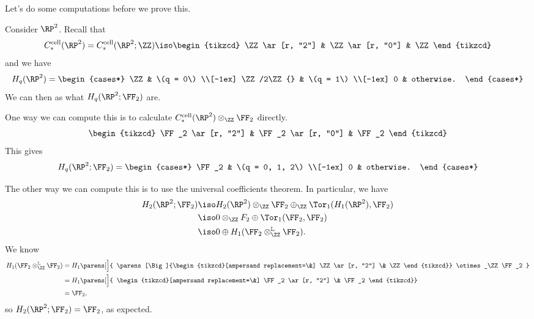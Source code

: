 \documentclass{standalone}
\begin{document}
Let's do some computations before we prove this.
\begin{example}
  Consider \(\RP^2\).
  Recall that
  \[
    \Ccell_*(\RP^2) = \Ccell_*(\RP^2; \ZZ) \iso \begin{tikzcd}
    		\ZZ \ar[r, "2"] & \ZZ \ar[r, "0"] & \ZZ
    \end{tikzcd}
  \]
  and we have
  \[
    H_q(\RP^2) = \begin{cases*}
      \ZZ & \(q = 0\) \\[-1ex]
      \ZZ/2\ZZ{} & \(q = 1\) \\[-1ex]
      0 & otherwise.
    \end{cases*}
  \]
  We can then as what \(H_q(\RP^2; \FF_2)\) are.

  One way we can compute this is to calculate
  \(\Ccell_*(\RP^2) \otimes_\ZZ \FF_2\) directly.
  \[
    \begin{tikzcd}
    	\FF_2 \ar[r, "2"] & \FF_2 \ar[r, "0"] & \FF_2
    \end{tikzcd}
  \]
  This gives
  \[
    H_q(\RP^2; \FF_2) = \begin{cases*}
      \FF_2 & \(q = 0, 1, 2\) \\[-1ex]
      0 & otherwise.
    \end{cases*}
  \]
  
  The other way we can compute this is to use
  the universal coefficients theorem.
  In particular, we have
  \begin{align*}
    H_2(\RP^2; \FF_2) &\iso H_2(\RP^2) \otimes_\ZZ \FF_2
                          \oplus_\ZZ \Tor_1(H_1(\RP^2), \FF_2) \\
      &\iso 0 \otimes_\ZZ F_2 \oplus \Tor_1(\FF_2, \FF_2) \\
      &\iso 0 \oplus H_1(\FF_2 \otimes^{\mathbb L}_\ZZ \FF_2).
  \end{align*}
  We know
  \begin{align*}
    H_1(\FF_2 \otimes^{\mathbb L}_\ZZ \FF_2)
      &= H_1\parens[\Big]{
        \parens[\Big]{\begin{tikzcd}[ampersand replacement=\&]
          \ZZ \ar[r, "2"] \& \ZZ
        \end{tikzcd}}
        \otimes_\ZZ \FF_2
      } \\
      &= H_1\parens[\Big]{
        \begin{tikzcd}[ampersand replacement=\&]
          \FF_2 \ar[r, "2"] \& \FF_2
        \end{tikzcd}} \\
      &= \FF_2,
  \end{align*}
  so \(H_2(\RP^2; \FF_2) = \FF_2\), as expected.


\end{example}
\end{document}
